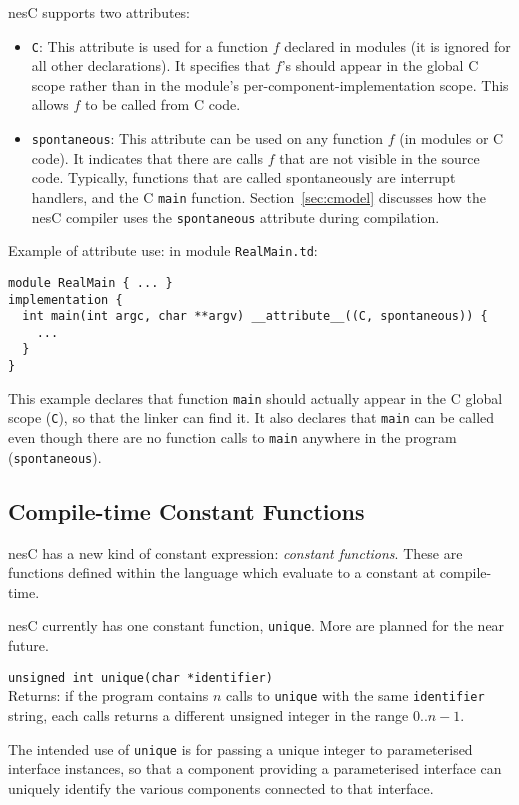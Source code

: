\documentclass[11pt]{article}
\newcommand{\code}[1]{{\tt #1}}
\newcommand{\file}[1]{{\tt #1}}
\newcommand{\nesc}{nesC\xspace}
\begin{document}
\nesc supports two attributes:
\begin{itemize}
\item \code{C}: This attribute is used for a function $f$ declared in
modules (it is ignored for all other declarations). It specifies that
$f$'s should appear in the global C scope rather than in the module's
per-component-implementation scope. This allows $f$ to be called from
C code.

\item \code{spontaneous}: This attribute can be used on any function
$f$ (in modules or C code). It indicates that there are calls $f$ that
are not visible in the source code. Typically, functions that are
called spontaneously are interrupt handlers, and the C \code{main}
function. Section~\ref{sec:cmodel} discusses how the \nesc compiler
uses the \code{spontaneous} attribute during compilation.
\end{itemize}

Example of attribute use: in module \file{RealMain.td}:
\begin{verbatim}
module RealMain { ... }
implementation {
  int main(int argc, char **argv) __attribute__((C, spontaneous)) {
    ...
  }
}
\end{verbatim}

This example declares that function \code{main} should actually appear
in the C global scope (\code{C}), so that the linker can find it. It
also declares that \code{main} can be called even though there are no
function calls to \code{main} anywhere in the program
(\code{spontaneous}). 

\subsection{Compile-time Constant Functions}

\nesc has a new kind of constant expression: \emph{constant
functions}. These are functions defined within the language which
evaluate to a constant at compile-time.

\nesc currently has one constant function, \code{unique}. More are planned
for the near future.

\code{unsigned int unique(char *identifier)} \\ Returns: if the program
contains $n$ calls to \code{unique} with the same \code{identifier}
string, each calls returns a different unsigned integer in the range
$0 .. n-1$.

The intended use of \code{unique} is for passing a unique integer
to parameterised interface instances, so that a component providing
a parameterised interface can uniquely identify the various components
connected to that interface.
\end{document}
